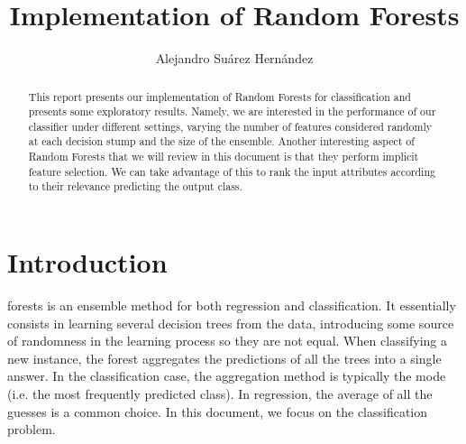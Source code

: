 \documentclass[journal, a4paper]{IEEEtran}
\begin{document}
	\title{Implementation of Random Forests}
	\author{Alejandro Su\'arez Hern\'andez}
	\maketitle

\begin{abstract}
	This report presents our implementation of Random Forests for
	classification and presents
	some exploratory results. Namely, we are interested in the performance
	of our classifier under different settings, varying the number of
	features considered randomly at each decision stump and the size of the
	ensemble. Another interesting aspect of Random Forests that we will
	review in this document is that they perform implicit feature
	selection. We can take advantage of this to rank the input attributes
	according to their relevance predicting the output class.
\end{abstract}

\section{Introduction}
	 forests is an ensemble method for both regression
	and classification. It essentially consists in learning several decision
	trees from the data, introducing some source of randomness
	in the learning process so they are not
	equal. When classifying a new instance, the forest aggregates the
	predictions of all the trees into a single answer. In the classification
	case, the aggregation method is typically the mode (i.e. the most
	frequently predicted class). In regression, the average of all the guesses
	is a common choice. In this document, we focus on the classification
	problem.
	
\end{document}
